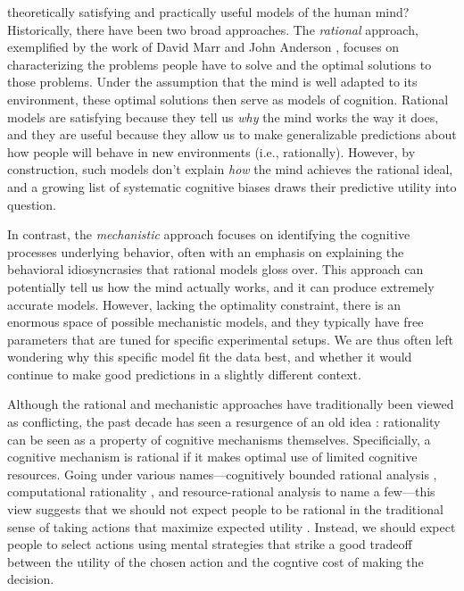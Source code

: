 \label{introduction}

 theoretically satisfying and practically useful models of the human mind? Historically, there have been two broad approaches. The \emph{rational} approach, exemplified by the work of David Marr \citeyearpar{marr1982vision} and John Anderson \citeyearpar{anderson1990adaptive}, focuses on characterizing the problems people have to solve and the optimal solutions to those problems. Under the assumption that the mind is well adapted to its environment, these optimal solutions then serve as models of cognition. Rational models are satisfying because they tell us \emph{why} the mind works the way it does, and they are useful because they allow us to make generalizable predictions about how people will behave in new environments (i.e., rationally). However, by construction, such models don't explain \emph{how} the mind achieves the rational ideal, and a growing list of systematic cognitive biases \citep{kahneman2011thinking} draws their predictive utility into question. 

In contrast, the \emph{mechanistic} approach focuses on identifying the cognitive processes underlying behavior, often with an emphasis on explaining the behavioral idiosyncrasies that rational models gloss over. This approach can potentially tell us how the mind actually works, and it can produce extremely accurate models. However, lacking the optimality constraint, there is an enormous space of possible mechanistic models, and they typically have free parameters that are tuned for specific experimental setups. We are thus often left wondering why this specific model fit the data best, and whether it would continue to make good predictions in a slightly different context.

Although the rational and mechanistic approaches have traditionally been viewed as conflicting, the past decade has seen a resurgence of an old idea \citep{simon1955behavioral}: rationality can be seen as a property of cognitive mechanisms themselves. Specificially, a cognitive mechanism is rational if it makes optimal use of limited cognitive resources. Going under various names---cognitively bounded rational analysis \citep{howes2009rational}, computational rationality \citep{lewis2014computational,gershman2015computational}, and resource-rational analysis \citep{griffiths2015rational,lieder2020resourcerational} to name a few---this view suggests that we should not expect people to be rational in the traditional sense of taking actions that maximize expected utility \citep{vonneumann1944theory}. Instead, we should expect people to select actions using mental strategies that strike a good tradeoff between the utility of the chosen action and the cogntive cost of making the decision.

